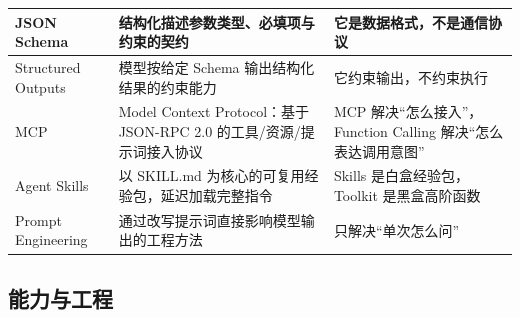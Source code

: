 \documentclass[9pt,a4paper,twocolumn]{ctexart}
\begin{document}
{\begin{tabular}{|p{}|p{}|p{}|}
\hline
JSON Schema & 结构化描述参数类型、必填项与约束的契约 & 它是数据格式，不是通信协议 \\
\hline
Structured Outputs & 模型按给定 Schema 输出结构化结果的约束能力 & 它约束输出，不约束执行 \\
\hline
MCP & Model Context Protocol：基于 JSON-RPC 2.0 的工具/资源/提示词接入协议 & MCP 解决“怎么接入”，Function Calling 解决“怎么表达调用意图” \\
\hline
Agent Skills & 以 SKILL.md 为核心的可复用经验包，延迟加载完整指令 & Skills 是白盒经验包，Toolkit 是黑盒高阶函数 \\
\hline
Prompt Engineering & 通过改写提示词直接影响模型输出的工程方法 & 只解决“单次怎么问” \\
\hline
\end{tabular}
}



\subsection*{能力与工程}
\end{document}
